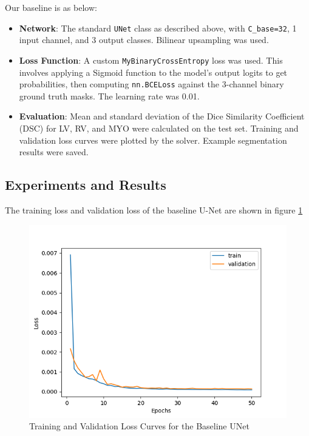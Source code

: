 \documentclass{article}
\begin{document}
Our baseline is as below:
\begin{itemize}
  \item \textbf{Network}: The standard \texttt{UNet} class as described above, with \texttt{C\_base=32}, 1 input channel,
        and 3 output classes. Bilinear upsampling was used.
  \item \textbf{Loss Function}: A custom \texttt{MyBinaryCrossEntropy} loss was used. This involves applying a Sigmoid
        function to the model's output logits to get probabilities, then computing \texttt{nn.BCELoss} against the 3-channel
        binary ground truth masks. The learning rate was 0.01.
  \item \textbf{Evaluation}: Mean and standard deviation of the Dice Similarity Coefficient (DSC) for LV, RV, and MYO
        were calculated on the test set. Training and validation loss curves were plotted by the solver.
        Example segmentation results were saved.
\end{itemize}

\subsection{Experiments and Results}
The training loss and validation loss of the baseline U-Net are shown in figure \ref{fig:baseline_unet_loss}
\begin{figure}[H]
  \centering
  \includegraphics[width=\linewidth]{../result/baseline_unet.png}
  \caption{Training and Validation Loss Curves for the Baseline UNet}
  \label{fig:baseline_unet_loss}
\end{figure}
\end{document}
